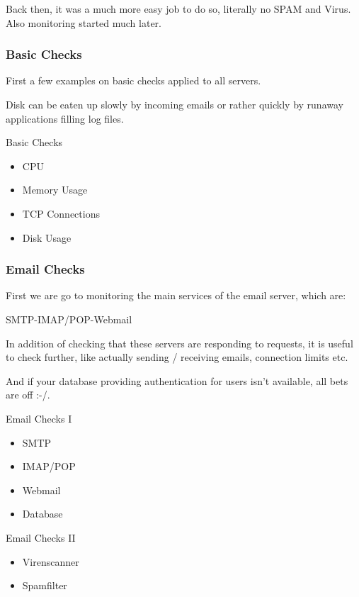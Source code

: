 Back then, it was a much more easy job to do
so, literally no SPAM and Virus. Also monitoring started much
later.

\subsubsection{Basic Checks}

First a few examples on basic checks applied to all servers.

Disk can be eaten up slowly by incoming emails or rather
quickly by runaway applications filling log files.

\begin{frame}{Basic Checks}
\begin{itemize}
\item CPU
\item Memory Usage
\item TCP Connections
\item Disk Usage
\end{itemize}
\end{frame}

\subsubsection{Email Checks}

First we are go to monitoring the main services of
the email server, which are:

SMTP-IMAP/POP-Webmail

In addition of checking that these servers
are responding to requests, it is useful to check
further, like actually sending / receiving emails,
connection limits etc.

And if your database providing authentication for
users isn't available, all bets are off :-/.

\begin{frame}{Email Checks I}
\begin{itemize}
\item SMTP
\item IMAP/POP
\item Webmail
\item Database
\end{itemize}
\end{frame}

\begin{frame}{Email Checks II}
\begin{itemize}
\item Virenscanner
\item Spamfilter
\end{itemize}
\end{frame}

